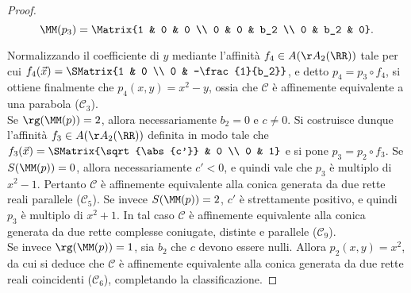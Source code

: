 \documentclass[11pt]{article}
\begin{document}
\begin{proof}
		\[ \MM(p_3) = \Matrix{1 & 0 & 0 \\ 0 & 0 & b_2 \\ 0 & b_2 & 0}. \]
		
		\vskip 0.05in
		
		Normalizzando il coefficiente di $y$ mediante
		l'affinità $f_4 \in A(\AA_2(\RR))$ tale per cui $f_4(\vec x) = \SMatrix{1 & 0 \\ 0 & -\frac{1}{b_2}}$,
		e detto $p_4 = p_3 \circ f_4$, si ottiene finalmente
		che $p_4(x, y) = x^2 - y$, ossia che $\mathcal{C}$ è
		affinemente equivalente a una parabola ($\mathcal{C}_3$). \\
		
		Se $\rg(\MM(p)) = 2$, allora necessariamente
		$b_2 = 0$ e $c \neq 0$. Si costruisce dunque
		l'affinità $f_3 \in A(\AA_2(\RR))$ definita in
		modo tale che $f_3(\vec x) = \SMatrix{\sqrt{\abs{c'}} & 0 \\ 0 & 1}$ e si pone
		$p_3 = p_2 \circ f_3$. Se $S(\MM(p)) = 0$, allora necessariamente $c' < 0$, e quindi vale che $p_3$ è multiplo di $x^2 - 1$. Pertanto $\mathcal{C}$ è affinemente
		equivalente alla conica generata da due rette reali parallele ($\mathcal{C}_5$). Se invece $S(\MM(p)) = 2$, $c'$ è strettamente positivo, e quindi $p_3$ è
		multiplo di $x^2 + 1$. In tal caso $\mathcal{C}$ è affinemente equivalente alla conica
		generata da due rette complesse coniugate, distinte e parallele ($\mathcal{C}_9$). \\
		
		Se invece $\rg(\MM(p)) = 1$, sia $b_2$ che $c$ devono
		essere nulli. Allora $p_2(x, y) = x^2$, da cui
		si deduce che $\mathcal{C}$ è affinemente
		equivalente alla conica generata da due rette
		reali coincidenti ($\mathcal{C}_6$), completando la classificazione.
		 
	\end{proof}
\end{document}
